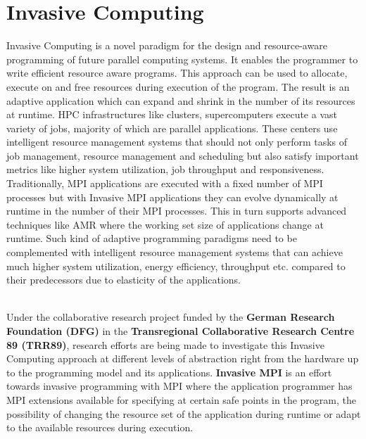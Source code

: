 \section{Invasive Computing}
Invasive Computing is a novel paradigm for the design and resource-aware programming of future parallel computing systems. It enables the programmer to write efficient resource aware programs. This approach can be used to allocate, execute on and free resources during execution of the program. The result is an adaptive application which can expand and shrink in the number of its resources at runtime. HPC infrastructures like clusters, supercomputers execute a vast variety of jobs, majority of which are parallel applications. These centers use intelligent resource management systems that should not only perform tasks of job management, resource management and scheduling but also satisfy important metrics like higher system utilization, job throughput and responsiveness. Traditionally, MPI applications are executed with a fixed number of MPI processes but with Invasive MPI applications they can evolve dynamically at runtime in the number of their MPI processes. This in turn supports advanced techniques like AMR where the working set size of applications change at runtime. Such kind of adaptive programming paradigms need to be complemented with intelligent resource management systems that can  achieve much higher system utilization, energy efficiency, throughput etc. compared to their predecessors due to elasticity of the applications.\par
\noindent
\\Under the collaborative research project funded by the \textbf{German Research Foundation (DFG)} in the \textbf{Transregional Collaborative Research Centre 89 (TRR89)}, research efforts are being made to investigate this Invasive Computing approach at different levels of abstraction right from the hardware up to the programming model and its applications. \textbf{Invasive MPI} is an effort towards invasive programming with MPI where the application programmer has MPI extensions available for specifying at certain safe points in the program, the possibility of changing the resource set of the application during runtime or adapt to the available resources during execution.
